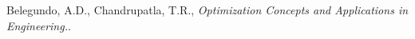 \documentclass{article}
\begin{document}

\begin{thebibliography}{99}

Belegundo, A.D., Chandrupatla, T.R.,
\newblock \emph{Optimization Concepts and Applications in Engineering.}.

\end{thebibliography}
\end{document}
